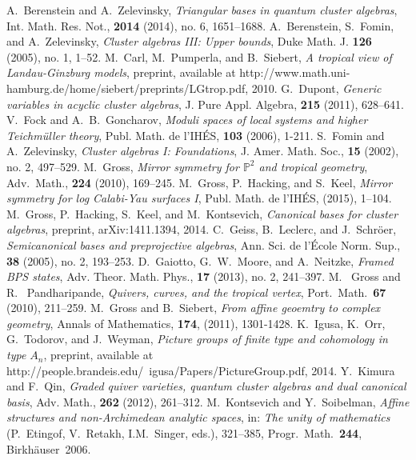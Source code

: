 \documentclass[11pt]{amsart}
\theoremstyle{remark}
\numberwithin{equation}{section}
\begin{document}
\begin{thebibliography}{99}
  
   A.~Berenstein and A.~Zelevinsky, \emph{Triangular bases in quantum cluster algebras}, Int. Math. Res. Not., \textbf{2014} (2014), no. 6, 1651--1688.
   A.~Berenstein, S.~Fomin, and A.~Zelevinsky, \emph{Cluster algebras III: Upper bounds}, Duke Math. J. \textbf{126} (2005), no. 1, 1--52.
   M.~Carl, M.~Pumperla, and B.~Siebert, \emph{A tropical view of Landau-Ginzburg models}, preprint, available at http://www.math.uni-hamburg.de/home/siebert/preprints/LGtrop.pdf, 2010.
   G.~Dupont, \emph{Generic variables in acyclic cluster algebras}, J. Pure Appl. Algebra, \textbf{215} (2011), 628--641.
   V.~Fock and A.~B.~Goncharov, \emph{Moduli spaces of local systems and higher Teichm\"{u}ller theory}, Publ. Math. de l'IH\'{E}S, {\bf 103} (2006), 1-211.
   S.~Fomin and A.~Zelevinsky, \emph{Cluster algebras I: Foundations},  J. Amer. Math. Soc., \textbf{15} (2002), no. 2, 497--529.
   M.~Gross,  \emph{Mirror symmetry for $\mathbb{P}^2$ and tropical geometry}, Adv.\ Math., {\bf 224} (2010), 169--245. 
   M.~Gross, P.~Hacking, and S.~Keel, \emph{Mirror symmetry for log Calabi-Yau surfaces I}, Publ. Math. de l'IH\'{E}S, (2015), 1--104.
   M.~Gross, P.~Hacking, S.~Keel, and M.~Kontsevich, \emph{Canonical bases for cluster algebras}, preprint, arXiv:1411.1394, 2014.
   C.~Geiss, B.~Leclerc, and J.~Schr\"{o}er, \emph{Semicanonical bases and preprojective algebras}, Ann. Sci. de l'\'{E}cole Norm. Sup., {\bf 38} (2005), no. 2, 193--253.
   D.~Gaiotto, G.~W.~Moore, and A.~Neitzke, \emph{Framed BPS states}, Adv. Theor. Math. Phys., {\bf 17} (2013), no. 2, 241--397.
   M. ~Gross and R. ~Pandharipande, \emph{Quivers, curves, and the tropical vertex}, Port.\ Math.\ {\bf 67} (2010), 211--259. 
   M.~Gross and B.~Siebert, \emph{From affine geoemtry to complex geometry}, Annals of Mathematics, {\bf 174}, (2011), 1301-1428.
   K.~Igusa, K.~Orr, G.~Todorov, and J.~Weyman, \emph{Picture groups of finite type and cohomology in type $A_n$}, preprint, available at http://people.brandeis.edu/~igusa/Papers/PictureGroup.pdf, 2014.
   Y.~Kimura and F.~Qin, \emph{Graded quiver varieties, quantum cluster algebras and dual canonical basis}, Adv. Math., {\bf 262} (2012), 261--312.
   M.\ Kontsevich and Y.\ Soibelman, \emph{Affine structures and non-Archimedean analytic spaces}, in: \textsl{The unity of mathematics} (P.~Etingof, V.~Retakh, I.M.~Singer, eds.),  321--385, Progr.\ Math.~{\bf 244}, Birkh\"auser~2006.

\end{thebibliography}
\end{document}
